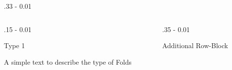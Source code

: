 \documentclass{postertheme}\usepackage[]{graphicx}\usepackage[]{color}
\begin{document}
\begin{frame}
\begin{columns}[onlytextwidth]
  \begin{column}{.33 \textwidth - 0.01 \textwidth}
  \end{column}

\end{columns}


\begin{columns}[onlytextwidth]
  
  \begin{column}{.15 \textwidth - 0.01 \textwidth}
    \begin{block}{Type 1}
        
      A simple text to describe the type of Folds
        
    \end{block}
  \end{column}

  \begin{column}{.35 \textwidth - 0.01 \textwidth}
    \begin{block}{Additional Row-Block}
        

\end{block}
\end{column}
\end{columns}
\end{frame}
\end{document}
